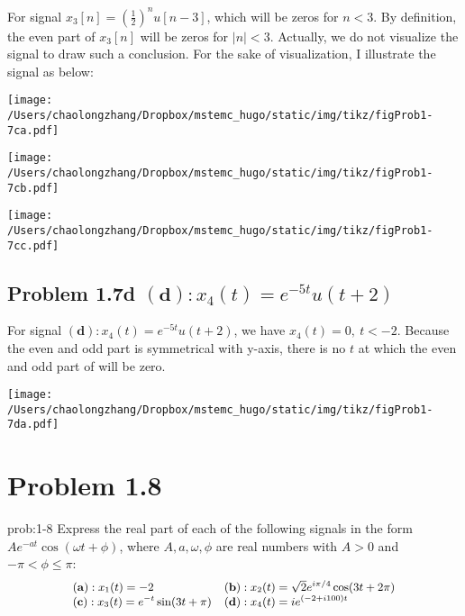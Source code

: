 \documentclass[koma,a4paper,utopia,12pt,listings-color,microtype,paralist,colorlinks,urlcolor=red]{org-article}
\begin{document}
For signal \(x_{3}[n] = ( \frac{1}{2} )^{n} u[n-3]\), which will be zeros for
\(n<3\). By definition, the even part of \(x_{3}[n]\) will be zeros for \(|n| <
3\). Actually, we do not visualize the signal to draw such a conclusion. For the
sake of visualization, I illustrate the signal as below:

\begin{center}
\texttt{[image: /Users/chaolongzhang/Dropbox/mstemc\_hugo/static/img/tikz/figProb1-7ca.pdf]}
\end{center}


\begin{center}
\texttt{[image: /Users/chaolongzhang/Dropbox/mstemc\_hugo/static/img/tikz/figProb1-7cb.pdf]}
\end{center}

\begin{center}
\texttt{[image: /Users/chaolongzhang/Dropbox/mstemc\_hugo/static/img/tikz/figProb1-7cc.pdf]}
\end{center}

\subsection{Problem 1.7d \(\mathbf{(d)}: x_{4}(t) = e^{-5t}u(t+2)\)}
\label{sec:orgca169be}

For signal \(\mathbf{(d)}: x_{4}(t) = e^{-5t}u(t+2)\), we have \(x_{4}(t) = 0,\
t<-2\). Because the even and odd part is symmetrical with y-axis, there is no
\(t\) at which the even and odd part of will be zero.

\begin{center}
\texttt{[image: /Users/chaolongzhang/Dropbox/mstemc\_hugo/static/img/tikz/figProb1-7da.pdf]}
\end{center}




\section{Problem 1.8}
\label{sec:org9d56250}


\begin{prob}[]{prob:1-8}
Express the real part of each of the following signals in the form
\(Ae^{-at}\cos(\omega t + \phi)\), where \(A,a,\omega, \phi\) are real numbers
with \(A>0\) and \(-\pi < \phi \leq \pi\):
\begin{equation*}
\small
\begin{array}{ll}
  \mathbf{( a )}: x_{1}(t) = -2 &  \mathbf{( b )}: x_{2}(t) = \sqrt{2}e^{i\pi/4}\cos(3t + 2\pi) \\
  \mathbf{( c )}: x_{3}(t) = e^{-t}\sin(3t + \pi) & \mathbf{( d )}: x_{4}(t) = i e^{(-2+i100)t}
\end{array}
\end{equation*}
\label{prob:1-8}
\end{prob}
\end{document}
